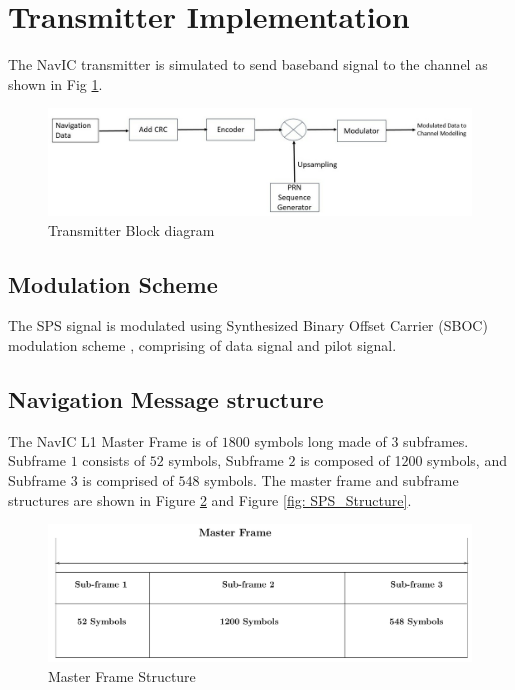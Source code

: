 \documentclass[conference]{IEEEtran}
\begin{document}
\section{Transmitter Implementation}
The NavIC transmitter is simulated to send baseband signal to the channel as shown in Fig \ref{fig:trans_flow}.

\begin{figure}[ht]
    \centering
    \includegraphics[width=1\columnwidth]{figs/trans_flow.jpg}
    \centering
    \caption{Transmitter Block diagram}
    \label{fig:trans_flow}
    \end{figure}


\subsection{Modulation Scheme} 
The SPS signal is modulated using Synthesized Binary Offset Carrier (SBOC) modulation 
scheme \cite{b2}, comprising of data signal and pilot signal. 

\subsection{Navigation Message structure}
The NavIC L1 Master Frame \cite{b2} is of $1800$ symbols long made of $3$ subframes. Subframe $1$ consists 
of $52$ symbols, Subframe $2$ is composed of 1$200$ symbols, and Subframe $3$ is comprised of 
$548$ 
symbols. The master frame and subframe \cite{b2} structures are shown in Figure \ref{fig:master_frame} and 
Figure \ref{fig: SPS_Structure}.

\begin{figure}[ht]
\centering
\includegraphics[width=1\columnwidth]{figs/master_frame}
\centering
\caption{Master Frame Structure}
\label{fig:master_frame}
\end{figure}
\end{document}
